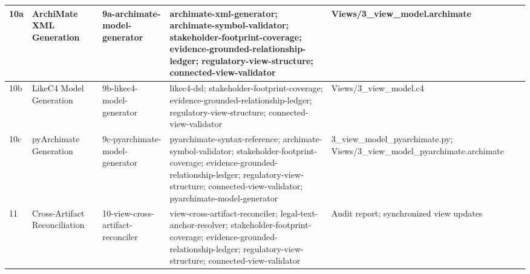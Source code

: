 \begin{landscape}
\begin{longtable}{@{}p{0.5cm}p{2.5cm}p{4.3cm}p{8.0cm}p{4.0cm}@{}}
\hline
10a & ArchiMate XML Generation & 9a-archimate-model-generator & archimate-xml-generator; archimate-symbol-validator; stakeholder-footprint-coverage; evidence-grounded-relationship-ledger; regulatory-view-structure; connected-view-validator & Views/3\_view\_model.archimate \\
\hline
10b & LikeC4 Model Generation & 9b-likec4-model-generator & likec4-dsl; stakeholder-footprint-coverage; evidence-grounded-relationship-ledger; regulatory-view-structure; connected-view-validator & Views/3\_view\_model.c4 \\
\hline
10c & pyArchimate Generation & 9c-pyarchimate-model-generator & pyarchimate-syntax-reference; archimate-symbol-validator; stakeholder-footprint-coverage; evidence-grounded-relationship-ledger; regulatory-view-structure; connected-view-validator; pyarchimate-model-generator & 3\_view\_model\_pyarchimate.py; Views/3\_view\_model\_pyarchimate.archimate \\
\hline
11 & Cross-Artifact Reconciliation & 10-view-cross-artifact-reconciler & view-cross-artifact-reconciler; legal-text-anchor-resolver; stakeholder-footprint-coverage; evidence-grounded-relationship-ledger; regulatory-view-structure; connected-view-validator & Audit report; synchronized view updates \\
\hline
\end{longtable}
\end{landscape}